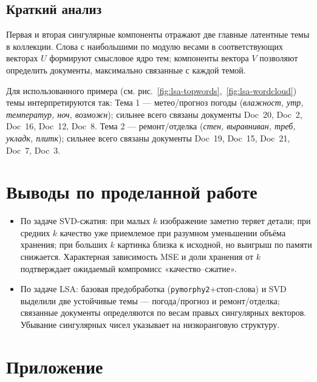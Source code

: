 \subsection*{Краткий анализ}
Первая и вторая сингулярные компоненты отражают две главные латентные темы в коллекции. Слова с наибольшими по модулю весами в соответствующих векторах \(U\) формируют смысловое ядро тем; компоненты вектора \(V\) позволяют определить документы, максимально связанные с каждой темой.

Для использованного примера (см. рис.~\ref{fig:lsa-topwords},~\ref{fig:lsa-wordcloud}) темы интерпретируются так: Тема 1 — метео/прогноз погоды (\emph{влажност, утр, температур, ноч, возможн}); сильнее всего связаны документы Doc~20, Doc~2, Doc~16, Doc~12, Doc~8. Тема 2 — ремонт/отделка (\emph{стен, выравниван, треб, укладк, плитк}); сильнее всего связаны документы Doc~19, Doc~15, Doc~21, Doc~7, Doc~3.

\section*{Выводы по проделанной работе}
\begin{itemize}
  \item По задаче SVD-сжатия: при малых \(k\) изображение заметно теряет детали; при средних \(k\) качество уже приемлемое при разумном уменьшении объёма хранения; при больших \(k\) картинка близка к исходной, но выигрыш по памяти снижается. Характерная зависимость MSE и доли хранения от \(k\) подтверждает ожидаемый компромисс «качество–сжатие».
  \item По задаче LSA: базовая предобработка (\texttt{pymorphy2}+стоп-слова) и SVD выделили две устойчивые темы — погода/прогноз и ремонт/отделка; связанные документы определяются по весам правых сингулярных векторов. Убывание сингулярных чисел указывает на низкоранговую структуру.
\end{itemize}

\section*{Приложение}
